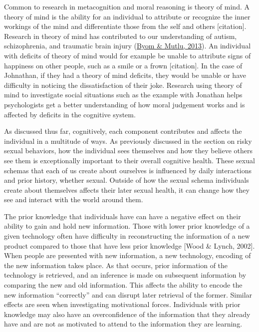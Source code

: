 \documentclass[
  donotrepeattitle,doc, 12pt, a4paper,floatsintext]{apa7}
\begin{document}
Common to research in metacognition and moral reasoning is theory of mind. A theory of mind is the ability for an individual to attribute or recognize the inner workings of the mind and differentiate those from the self and others {[}citation{]}. Research in theory of mind has contributed to our understanding of autism, schizophrenia, and traumatic brain injury (\protect\hyperlink{ref-byom2013}{Byom \& Mutlu, 2013}). An individual with deficits of theory of mind would for example be unable to attribute signs of happiness on other people, such as a smile or a frown {[}citation{]}. In the case of Johnathan, if they had a theory of mind deficits, they would be unable or have difficulty in noticing the dissatisfaction of their joke. Research using theory of mind to investigate social situations such as the example with Jonathan helps psychologists get a better understanding of how moral judgement works and is affected by deficits in the cognitive system.

As discussed thus far, cognitively, each component contributes and affects the individual in a multitude of ways. As previously discussed in the section on risky sexual behaviors, how the individual sees themselves and how they believe others see them is exceptionally important to their overall cognitive health. These sexual schemas that each of us create about ourselves is influenced by daily interactions and prior history, whether sexual. Outside of how the sexual schema individuals create about themselves affects their later sexual health, it can change how they see and interact with the world around them.

The prior knowledge that individuals have can have a negative effect on their ability to gain and hold new information. Those with lower prior knowledge of a given technology often have difficulty in reconstructing the information of a new product compared to those that have less prior knowledge {[}Wood \& Lynch, 2002{]}. When people are presented with new information, a new technology, encoding of the new information takes place. As that occurs, prior information of the technology is retrieved, and an inference is made on subsequent information by comparing the new and old information. This affects the ability to encode the new information ``correctly'' and can disrupt later retrieval of the former. Similar effects are seen when investigating motivational forces. Individuals with prior knowledge may also have an overconfidence of the information that they already have and are not as motivated to attend to the information they are learning.
\end{document}
